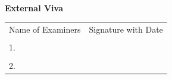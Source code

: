 \else
\vspace{1cm}
\begin{table}[H]
\centering
{}
\end{table}
\fi %

\ifStuNameCUsed \vspace{-0.75cm}\fi

\begin{center}
	\Large\textbf{External Viva}
\end{center}
\vspace{0.5cm}

\begin{table}[H]
\centering
\begin{tabular}{p{} c}
	\multicolumn{1}{c}{Name of Examiners} & Signature with Date \\
	& \\
	1. & \\
	& \\
	2. & \\
\end{tabular}
\end{table}
